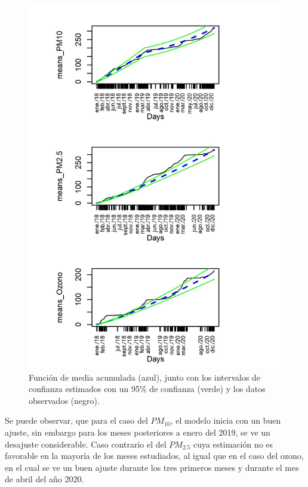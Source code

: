 \begin{figure}[h!]
\begin{center}
\includegraphics[width=13cm]{spdc_means}
\end{center}
\centering
\caption{ Función de media acumulada (azul), junto con los intervalos de confianza estimados con un 95\% de confianza (verde) y los datos observados (negro).  }
\label{mediasacumcomp}
\end{figure}



Se puede observar, que para el caso del $PM_{10}$, el modelo inicia con un buen ajuste, sin embargo para los meses posteriores a enero del 2019, se ve un desajuste considerable. Caso contrario el del $PM_{2.5}$ cuya estimación no es favorable en la mayoría de los meses estudiados, al igual que en el caso del ozono, en el cual se ve un buen ajuste durante los tres primeros meses y durante el mes de abril del año 2020. 



